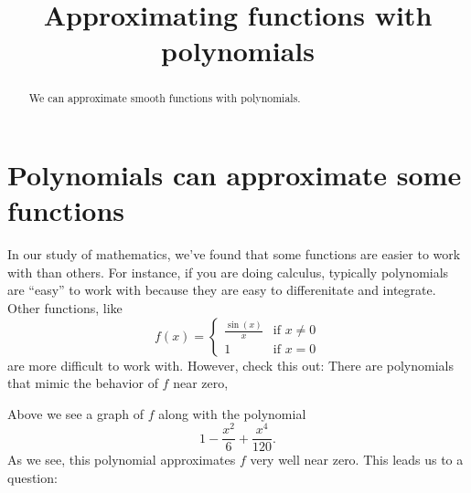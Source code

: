 \documentclass{ximera}
\title[Dig-In:]{Approximating functions with polynomials}
\begin{document}
\begin{abstract}
We can approximate smooth functions with polynomials.
\end{abstract}
\maketitle


\section{Polynomials can approximate some functions}

In our study of mathematics, we've found that some functions are
easier to work with than others. For instance, if you are doing
calculus, typically polynomials are ``easy'' to work with because they
are easy to differenitate and integrate. Other functions, like
\[
f(x) =
\begin{cases}
  \frac{\sin(x)}{x} &\text{if $x\ne 0$}\\
  1 &\text{if $x=0$}
\end{cases}
\]
are more difficult to work with. However, check this out: There are
polynomials that mimic the behavior of $f$ near zero,
\begin{image}
\end{image}
Above we see a graph of $f$ along with the polynomial
\[
1-\frac{x^2}{6}+\frac{x^4}{120}.
\]
As we see, this polynomial approximates $f$ very well near zero. This
leads us to a question:
\end{document}
